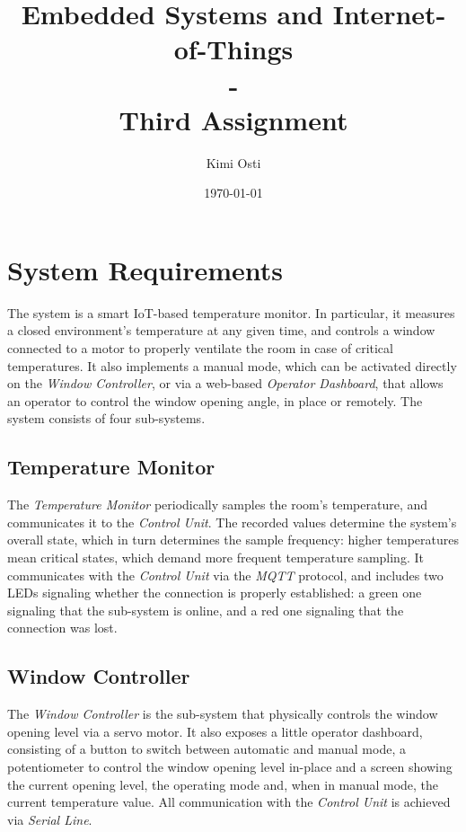 \documentclass[a4paper,12pt]{report}
\title{Embedded Systems and Internet-of-Things \\ - \\ Third Assignment}
\author{Kimi Osti}
\date{\today}
\begin{document}
	
	\maketitle
	\tableofcontents
	
	\chapter{System Requirements}
	The system is a smart IoT-based temperature monitor. In particular, it measures a closed environment's temperature at any given time, and controls a window connected to a motor to properly ventilate the room in case of critical temperatures. It also implements a manual mode, which can be activated directly on the \textit{Window Controller}, or via a web-based \textit{Operator Dashboard}, that allows an operator to control the window opening angle, in place or remotely.
	\newline The system consists of four sub-systems.
	\section{Temperature Monitor}
	The \textit{Temperature Monitor} periodically samples the room's temperature, and communicates it to the \textit{Control Unit}. The recorded values determine the system's overall state, which in turn determines the sample frequency: higher temperatures mean critical states, which demand more frequent temperature sampling. It communicates with the \textit{Control Unit} via the \textit{MQTT} protocol, and includes two LEDs signaling whether the connection is properly established: a green one signaling that the sub-system is online, and a red one signaling that the connection was lost.
	\section{Window Controller}
	The \textit{Window Controller} is the sub-system that physically controls the window opening level via a servo motor. It also exposes a little operator dashboard, consisting of a button to switch between automatic and manual mode, a potentiometer to control the window opening level in-place and a screen showing the current opening level, the operating mode and, when in manual mode, the current temperature value.
	\newline All communication with the \textit{Control Unit} is achieved via \textit{Serial Line}.
\end{document}
